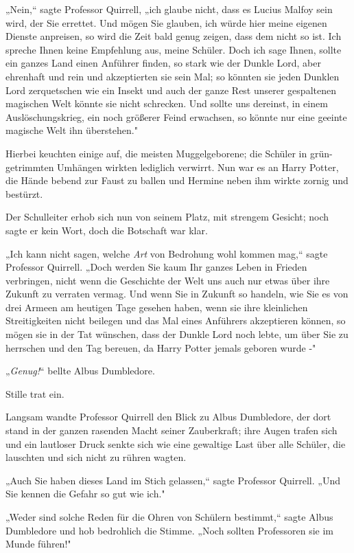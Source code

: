 {„Nein,“ sagte Professor Quirrell, „ich glaube nicht, dass es Lucius Malfoy sein wird, der Sie errettet. Und mögen Sie glauben, ich würde hier meine eigenen Dienste anpreisen, so wird die Zeit bald genug zeigen, dass dem nicht so ist. Ich spreche Ihnen keine Empfehlung aus, meine Schüler. Doch ich sage Ihnen, sollte ein ganzes Land einen Anführer finden, so stark wie der Dunkle Lord, aber ehrenhaft und rein und akzeptierten sie sein Mal; so könnten sie jeden Dunklen Lord zerquetschen wie ein Insekt und auch der ganze Rest unserer gespaltenen magischen Welt könnte sie nicht schrecken. Und sollte uns dereinst, in einem Auslöschungskrieg, ein noch größerer Feind erwachsen, so könnte nur eine geeinte magische Welt ihn überstehen."

Hierbei keuchten einige auf, die meisten Muggelgeborene; die Schüler in grün-getrimmten Umhängen wirkten lediglich verwirrt. Nun war es an Harry Potter, die Hände bebend zur Faust zu ballen und Hermine neben ihm wirkte zornig und bestürzt.

Der Schulleiter erhob sich nun von seinem Platz, mit strengem Gesicht; noch sagte er kein Wort, doch die Botschaft war klar.

„Ich kann nicht sagen, welche \emph{Art} von Bedrohung wohl kommen mag,“ sagte Professor Quirrell. „Doch werden Sie kaum Ihr ganzes Leben in Frieden verbringen, nicht wenn die Geschichte der Welt uns auch nur etwas über ihre Zukunft zu verraten vermag. Und wenn Sie in Zukunft so handeln, wie Sie es von drei Armeen am heutigen Tage gesehen haben, wenn sie ihre kleinlichen Streitigkeiten nicht beilegen und das Mal eines Anführers akzeptieren können, so mögen sie in der Tat wünschen, dass der Dunkle Lord noch lebte, um über Sie zu herrschen und den Tag bereuen, da Harry Potter jemals geboren wurde -"

„\emph{Genug!}“ bellte Albus Dumbledore.

Stille trat ein.

Langsam wandte Professor Quirrell den Blick zu Albus Dumbledore, der dort stand in der ganzen rasenden Macht seiner Zauberkraft; ihre Augen trafen sich und ein lautloser Druck senkte sich wie eine gewaltige Last über alle Schüler, die lauschten und sich nicht zu rühren wagten.

„Auch Sie haben dieses Land im Stich gelassen,“ sagte Professor Quirrell. „Und Sie kennen die Gefahr so gut wie ich."

„Weder sind solche Reden für die Ohren von Schülern bestimmt,“ sagte Albus Dumbledore und hob bedrohlich die Stimme. „Noch sollten Professoren sie im Munde führen!"

}
